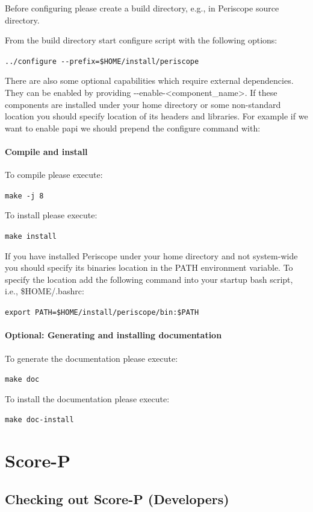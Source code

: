 \documentclass[11pt,a4paper, oneside]{book} %
\newcommand{\installloc}[1]{\$HOME/install/#1}
\newcommand{\ptfbrackets}[1]{\textless #1\textgreater}
\begin{document}
Before configuring please create a build directory, e.g., in Periscope source
directory.

From the build directory start configure script with the following options:

\texttt{../configure -{}-prefix=\installloc{periscope}}

There are also some optional capabilities which require external dependencies.
They can be enabled by providing -{}-enable-\ptfbrackets{component\_name}.
If these components are installed under your home directory or some non-standard
location you should specify location of its headers and libraries.
For example if we want to enable papi we should prepend the configure command
with:

\subsubsection{Compile and install}
To compile please execute:

\texttt{make -j 8}

To install please execute:

\texttt{make install}

If you have installed Periscope under your home directory and not system-wide you
should specify its binaries location in the PATH environment variable. To
specify the location add the following command into your startup bash script,
i.e., \$HOME/.bashrc:

\texttt{export PATH=\installloc{periscope/bin}:\$PATH}


\subsubsection{Optional: Generating and installing documentation}
To generate the documentation please execute:

\texttt{make doc}

To install the documentation please execute:

\texttt{make doc-install}

\chapter{Score-P}

\section{Checking out Score-P (Developers)}
\end{document}
